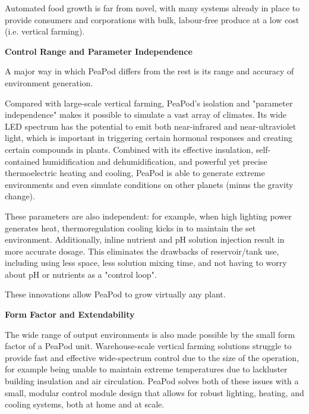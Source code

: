 \documentclass{report}
\begin{document}


Automated food growth is far from novel, with many systems already in place to provide consumers and corporations with bulk, labour-free produce at a low cost (i.e. vertical farming). 

\textbf{Control Range and Parameter Independence}

A major way in which PeaPod differs from the rest is its range and accuracy of environment generation.

Compared with large-scale vertical farming, PeaPod’s isolation and "parameter independence" makes it possible to simulate a vast array of climates. Its wide LED spectrum has the potential to emit both near-infrared and near-ultraviolet light, which is important in triggering certain hormonal responses and creating certain compounds in plants. Combined with its effective insulation, self-contained humidification and dehumidification, and powerful yet precise thermoelectric heating and cooling, PeaPod is able to generate extreme environments and even simulate conditions on other planets (minus the gravity change). 

These parameters are also independent: for example, when high lighting power generates heat, thermoregulation cooling kicks in to maintain the set environment. Additionally, inline nutrient and pH solution injection result in more accurate dosage. This eliminates the drawbacks of reservoir/tank use, including using less space, less solution mixing time, and not having to worry about pH or nutrients as a "control loop".

These innovations allow PeaPod to grow virtually any plant. 

\textbf{Form Factor and Extendability}

The wide range of output environments is also made possible by the small form factor of a PeaPod unit. Warehouse-scale vertical farming solutions struggle to provide fast and effective wide-spectrum control due to the size of the operation, for example being unable to maintain extreme temperatures due to lackluster building insulation and air circulation. PeaPod solves both of these issues with a small, modular control module design that allows for robust lighting, heating, and cooling systems, both at home and at scale.
\end{document}
